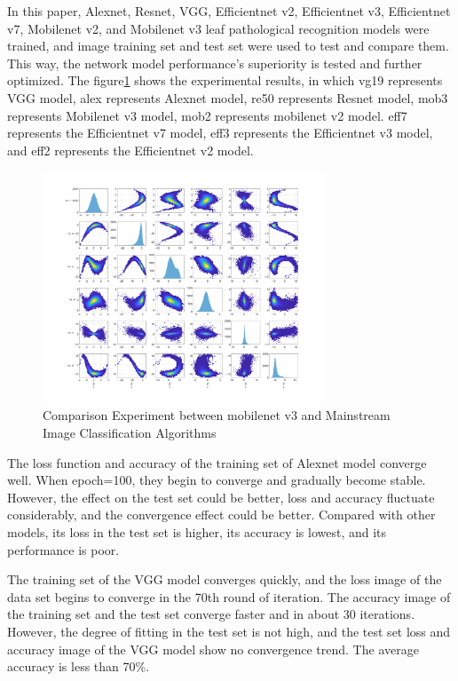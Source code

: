 \documentclass[a4paper,fleqn]{cas-sc}
\begin{document}
In this paper, Alexnet, Resnet, VGG, Efficientnet v2, Efficientnet v3, Efficientnet v7, Mobilenet v2, and Mobilenet v3 leaf pathological recognition models were trained, and image training set and test set were used to test and compare them. This way, the network model performance's superiority is tested and further optimized. The figure\ref{fig:f4} shows the experimental results, in which vg19 represents VGG  model, alex represents Alexnet model, re50 represents Resnet model, mob3 represents Mobilenet v3 model, mob2 represents mobilenet v2 model. eff7 represents the Efficientnet v7 model, eff3 represents the Efficientnet v3 model, and eff2 represents the Efficientnet v2 model. 
\begin{figure}
\centering
\includegraphics[width=0.75\textwidth]{figs/f4.png}
\caption{Comparison Experiment between mobilenet v3 and Mainstream Image Classification Algorithms}
\label{fig:f4}
\end{figure}

The loss function and accuracy of the training set of Alexnet model converge well. When epoch=100, they begin to converge and gradually become stable. However, the effect on the test set could be better, loss and accuracy fluctuate considerably, and the convergence effect could be better. Compared with other models, its loss in the test set is higher, its accuracy is lowest, and its performance is poor. 

The training set of the VGG model converges quickly, and the loss image of the data set begins to converge in the 70th round of iteration. The accuracy image of the training set and the test set converge faster and in about 30 iterations. However, the degree of fitting in the test set is not high, and the test set loss and accuracy image of the VGG model show no convergence trend. The average accuracy is less than 70\%. 
\end{document}
